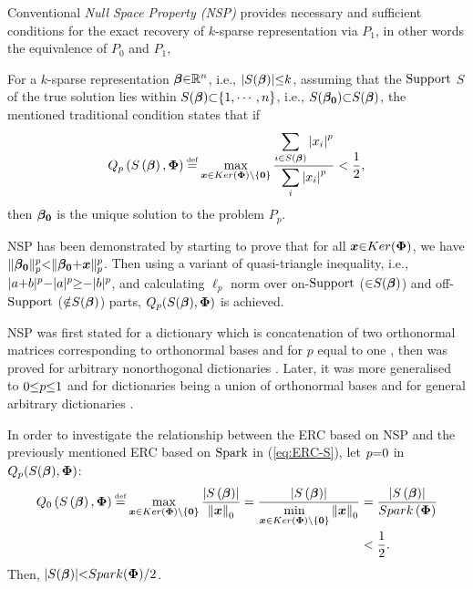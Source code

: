 Conventional \emph{Null Space Property (NSP)} provides necessary and sufficient conditions for the exact recovery of $k$-sparse representation via $P_1$, in other words the equivalence of $P_0$ and $P_1$, 

For a $k$-sparse representation $\boldsymbol{\beta} {\in} \mathbb{R}^{n}$, i.e., $|S(\boldsymbol{\beta})| {\leq} k$, assuming that the $\mathrm{Support}$ $S$ of the true solution lies within $S(\boldsymbol{\beta}) {\subset} \{1, \cdots , n\}$, i.e., $S(\boldsymbol{\beta_0}) {\subset} S(\boldsymbol{\beta})$, the mentioned traditional condition states that if 
\begin{equation*}
Q_p \myparanthese{S\myparanthese{\mybeta} , \myPhi} \myeq 
\max_{\boldsymbol{x} \in \myKerMath \backslash\left\{\boldsymbol{0}\right\}}{\frac{\displaystyle\sum_{i \in S\myparanthese{\mybeta}} \myabs{x_i} ^ p}{\displaystyle\sum_{i} \myabs{x_i} ^ p}} < \frac12,
\end{equation*}
then $\boldsymbol{\beta_0}$ is the unique solution to the problem $P_p$.

NSP has been demonstrated by starting to prove that for all $\boldsymbol{x} {\in} Ker(\boldsymbol{\Phi})$, we have $\Vert \boldsymbol{\beta_0} \Vert_p^p {<} \Vert \boldsymbol{\beta_0} {+} \boldsymbol{x} \Vert_p^p$.
Then using a variant of quasi-triangle inequality, i.e., $\vert a {+} b \vert^p {-} \vert a \vert^p {\geq} {-} \vert b \vert^p$, and calculating $\ell_p$ norm over on-$\mathrm{Support}$ (${\in} S(\boldsymbol{\beta})$) and off-$\mathrm{Support}$ (${\notin} S(\boldsymbol{\beta})$) parts, $Q_p (S(\boldsymbol{\beta}) , \boldsymbol{\Phi})$ is achieved.

NSP was first stated for a dictionary which is concatenation of two orthonormal matrices corresponding to orthonormal bases and for $p$ equal to one \cite{Donoho2001,Elad2001,Elad2002a,Feuer2003}, then was proved for arbitrary nonorthogonal dictionaries \cite{Donoho2003,Gribonval2003,Zhang2005a,Stojnic2008,Cohen2009}. 
Later, it was more generalised to $0 {\leq} p {\leq} 1$ and for dictionaries being a union of orthonormal bases \cite{Gribonval2003,Gribonval2003a} and for general arbitrary dictionaries \cite{Gribonval2004a,Gribonval2007}.

In order to investigate the relationship between the ERC based on NSP and the previously mentioned ERC based on $\mathrm{Spark}$ in (\ref{eq:ERC-S}), let $p {=} 0$ in $Q_p (S(\boldsymbol{\beta}) , \boldsymbol{\Phi})$:
\begin{equation*}
\begin{aligned}
Q_0 \myparanthese{S\myparanthese{\mybeta} , \myPhi} \myeq 
\max_{\boldsymbol{x} \in \myKerMath \backslash\left\{\boldsymbol{0}\right\}}{\frac{\myabs{S\myparanthese{\mybeta}}}{\mynorm{\boldsymbol{x}}_0}} 
= \frac{\myabs{S\myparanthese{\mybeta}}}{\displaystyle\min_{\boldsymbol{x} \in \myKerMath \backslash\left\{\boldsymbol{0}\right\}} \mynorm{\boldsymbol{x}}_0} 
& = \frac{\myabs{S\myparanthese{\mybeta}}}{\mySpk\myparanthese{\myPhi}} \\
& < \frac12.
\end{aligned}
\end{equation*}
Then, $|S(\boldsymbol{\beta})| {<} Spark(\boldsymbol{\Phi}) / 2$.


